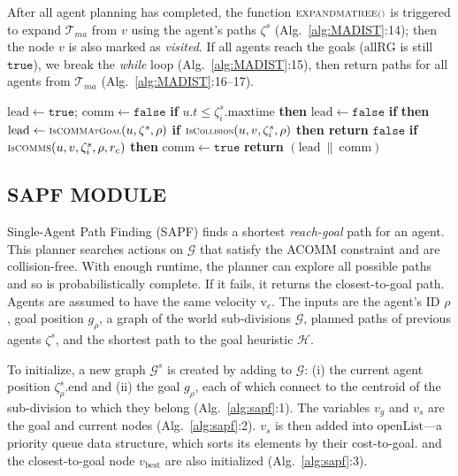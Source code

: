 \documentclass[letterpaper, 10 pt, conference]{ieeeconf}  %
\newcommand{\Acronym}[1]{\ensuremath{{{\texttt{#1}}}}}
\newcommand{\Symbol}[1]{\ensuremath{\mathcal{#1}}}
\newcommand{\Function}[1]{\ensuremath{{\scriptstyle{{\textsc{#1}}}}}}
\newcommand{\Var}[1]{\ensuremath{{{\mathrm{#1}}}}}
\newcommand{\False}{\ensuremath{\Acronym{false}}}
\newcommand{\True}{\ensuremath{\Acronym{true}}}
\newcommand{\Traj}{\ensuremath{\zeta}}
\newcommand{\Tree}{\Symbol{T}}
\begin{document}
After all agent planning has completed, the function $\Function{EXPANDMATREE()}$ is 
triggered to expand $\Tree_{ma}$ from $v$ using the agent's paths $\Traj^s$ 
(Alg.~\ref{alg:MADIST}:14); then the node $v$ is also marked as \textit{visited}.
If all agents reach the goals ($\Var{allRG}$ is still $\True$), we break the 
\emph{while} loop (Alg.~\ref{alg:MADIST}:15), then return paths for all agents 
from $\Tree_{ma}$ (Alg.~\ref{alg:MADIST}:16--17).

\begin{algorithm}[ht]
\caption{$\Function{IsNodeValid}(\rho, \Traj^s, u, v, r_c$) (\textit{Dynamic leading is employed}) }
\label{alg:isNodeValid}
\begin{algorithmic}[1]
\footnotesize
\STATE $\Var{lead} \leftarrow \True$; $\Var{comm} \leftarrow \False$\;
    \FOR{ $1 \leq i \leq |\Traj^s |$ }
        \STATE \textbf{if} $u.t \leq \Traj^s_i.\text{maxtime}$ \textbf{then} $\Var{lead} \gets \False$
    \ENDFOR
    \STATE \textbf{if }  \textbf{then} $\text{lead} \gets \Function{IsCOMMAtGoal}(u, \Traj^s, \rho)$\;
    \FOR{$1 \leq i \leq |\Traj^s|$}
        \STATE \textbf{if} $\Function{IsCollision}(u, v, \Traj^s_i, \rho)$ \textbf{then return} $\False$\;
        \STATE \textbf{if} $\Function{IsCOMMS}(u, v, \Traj^s_i, \rho, r_c)$ \textbf{then} $\Var{comm} \leftarrow \True$\;
    \ENDFOR
    \STATE \textbf{return} {$(\Var{lead} \ \| \ \Var{comm})$ }\;
\end{algorithmic}
\end{algorithm}

\subsection{SAPF MODULE}\label{sec:SAPF}
Single-Agent Path Finding (SAPF) finds a shortest \textit{reach-goal} path for an agent. 
This planner searches actions on $\mathcal{G}$ that satisfy the ACOMM constraint and 
are collision-free. With enough runtime, the planner can explore all possible paths 
and so is probabilistically complete.
If it fails, it returns the closest-to-goal path. Agents are assumed to have the same 
velocity $\Var{v}_c$.
The inputs are the agent's ID $\rho$, goal position $g_\rho$, a graph of the world 
sub-divisions $\mathcal{G}$, planned paths of previous agents $\Traj^s$, and the shortest
path to the goal heuristic $\mathcal{H}$.

To initialize, a new graph $\mathcal{G}^s$ is created by adding to $\mathcal{G}$: 
(i) the current agent position $\Traj^s_\rho.\Var{end}$ and (ii) the goal $g_\rho$, 
each of which connect to the centroid of the sub-division to which they belong (Alg.~\ref{alg:sapf}:1).
The variables $v_g$ and $v_s$ are the goal and current nodes (Alg.~\ref{alg:sapf}:2).
$v_s$ is then added into $\Var{openList}$---a priority queue data structure, which 
sorts its elements by their cost-to-goal.  and the closest-to-goal 
node $v_\text{best}$ are also initialized (Alg.~\ref{alg:sapf}:3).
\end{document}
